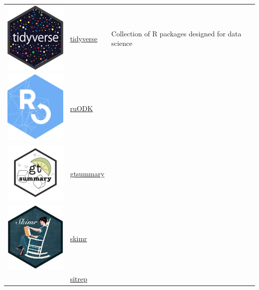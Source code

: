 \documentclass[
  letterpaper,
  DIV=11,
  numbers=noendperiod]{scrreprt}
\begin{document}
\begin{longtable}[]{@{}
  >{\raggedright\arraybackslash}p{}
  >{\raggedright\arraybackslash}p{}
  >{\raggedright\arraybackslash}p{}@{}}
\toprule()
\endhead
\includegraphics[width=1.30208in,height=\textheight]{./images/tidyverse-logo.png}
& \href{https://www.tidyverse.org/}{tidyverse} & Collection of R
packages designed for data science \\
\includegraphics[width=1.30208in,height=\textheight]{./images/logo.png}
& \href{https://docs.ropensci.org/ruODK/index.html}{ruODK} & \\
\includegraphics[width=1.30208in,height=\textheight]{./images/logo-01.png}
& \href{https://www.danieldsjoberg.com/gtsummary/}{gtsummary} & \\
\includegraphics[width=1.30208in,height=\textheight]{./images/paste-A6E65357.png}
&
\href{https://cran.r-project.org/web/packages/skimr/vignettes/skimr.html}{skimr}
& \\
& \href{https://github.com/R4EPI/sitrep}{sitrep} & \\
\bottomrule()
\end{longtable}
\end{document}
